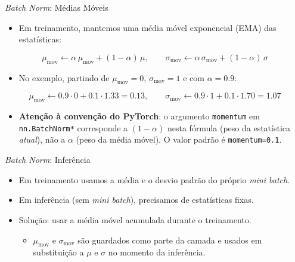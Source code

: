 \documentclass[aspectratio=169,xcolor=dvipsnames]{beamer}
\begin{document}
\begin{frame}{\textit{Batch Norm}: Médias Móveis}
\begin{itemize}
    \item Em treinamento, mantemos uma média móvel exponencial (EMA) das estatísticas:
\end{itemize}
\begin{equation*}
    \mu_{\text{mov}} \leftarrow \alpha\,\mu_{\text{mov}} + (1-\alpha)\,\mu, \qquad
    \sigma_{\text{mov}} \leftarrow \alpha\,\sigma_{\text{mov}} + (1-\alpha)\,\sigma
\end{equation*}
\begin{itemize}
    \item No exemplo, partindo de $\mu_{\text{mov}} = 0$, $\sigma_{\text{mov}} = 1$ e com $\alpha = 0.9$:
\end{itemize}
\begin{equation*}
    \mu_{\text{mov}} \leftarrow 0.9 \cdot 0 + 0.1 \cdot 1.33 = 0.13, \qquad
    \sigma_{\text{mov}} \leftarrow 0.9 \cdot 1 + 0.1 \cdot 1.70 = 1.07
\end{equation*}
\begin{itemize}
    \item \textbf{Atenção à convenção do PyTorch}: o argumento \texttt{momentum} em \texttt{nn.BatchNorm*} corresponde a $(1-\alpha)$ nesta fórmula (peso da estatística \emph{atual}), não a $\alpha$ (peso da média móvel). O valor padrão é \texttt{momentum=0.1}.
\end{itemize}
\end{frame}

\begin{frame}{\textit{Batch Norm}: Inferência}
\begin{itemize}
    \item Em treinamento usamos a média e o desvio padrão do próprio \textit{mini batch}.
    \item Em inferência (sem \textit{mini batch}), precisamos de estatísticas fixas.
    \item Solução: usar a média móvel acumulada durante o treinamento.
    \begin{itemize}
        \item $\mu_{\text{mov}}$ e $\sigma_{\text{mov}}$ são guardados como parte da camada e usados em substituição a $\mu$ e $\sigma$ no momento da inferência.
    \end{itemize}
\end{itemize}
\end{frame}
\end{document}
